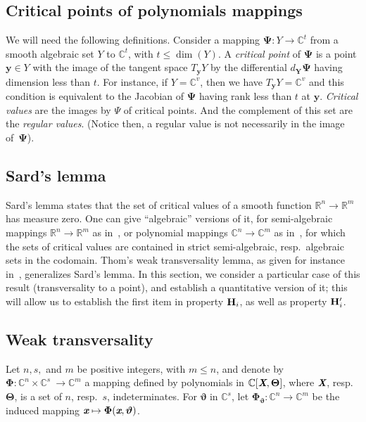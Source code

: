 \documentclass[a4paper]{article}
\def\Xb{\textit{\textbf{X}}}
\def\Thetab{\bm{\Theta}}
\def\thetab{\bm{\vartheta}}
\def\xb{\textit{\textbf{x}}}
\def\dt{s}
\def\C{\mathbb{C}}
\def\R{\mathbb{R}}
\begin{document}
\subsection{Critical points of polynomials mappings}
We will need the following definitions. Consider a mapping $\bm \Psi : Y \rightarrow \C^t$ 
from a smooth algebraic set $Y$ to $\C^t$, with $t\le \dim(Y)$. A {\em
  critical point} of $\bm \Psi$ is a point $\bm y \in Y$ with the
image of the tangent space $T_{\bm y} Y$ by the differential $d_{\bm
  Y} \bm \Psi$ having dimension less than $t$. For instance, if
$Y=\C^v$, then we have $T_{\bm y} Y=\C^v$ and this condition is equivalent
to the Jacobian of $\bm \Psi$ having rank less than $t$ at $\bm y$.
{\em Critical values} are the images by $\Psi$ of critical points. And the
complement of this set are the {\em regular values}. (Notice then, a regular
value is not necessarily in the image of~$\bm\Psi$).


\subsection{Sard's lemma}
Sard's lemma states that the set of critical values of a smooth
function $\R^n \to \R^m$ has measure zero. One can give ``algebraic''
versions of it, for semi-algebraic mappings $\R^n \to \R^m$ as
in~\cite[Chapter~9]{bochnak1998real}, or polynomial mappings $\C^n \to
\C^m$ as in~\cite[Chapter~3]{Mumford76}, for which the sets of
critical values are contained in strict semi-algebraic,
resp.\ algebraic sets in the codomain. Thom's weak transversality
lemma, as given for instance in~\cite{demazure2000bifurcations},
generalizes Sard's lemma. In this section, we consider a particular
case of this result (transversality to a point), and establish a
quantitative version of it; this will allow us to establish the first
item in property ${\bf H}_i$, as well as property ${\bf H}'_i$. 


\subsection{Weak transversality}
Let $n,\dt,$ and $m$ be positive integers, with $m \le n$, and denote
by $\bm\Phi :\C^n \times \C^{\dt} ~ \rightarrow \C^{m}$ a mapping
defined by polynomials in $\C[\Xb,\Thetab]$, where $\Xb$,
resp.\ $\Thetab$, is a set of $n$, resp.\ $\dt$, indeterminates.  For
$\thetab$ in $\C^{\dt}$, let $\bm\Phi_{\thetab} : \C^n \rightarrow
\C^{m}$ be the induced mapping $\xb\mapsto \bm\Phi(\xb,\thetab)$.  
\end{document}
